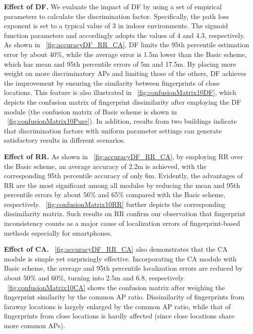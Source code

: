 \documentclass[10pt,conference,compsocconf,letterpaper]{./sty/IEEEtran}
\newcommand{\empha}[1]{{\bf #1}}
\newcommand{\rev}[1]{{\color{blue}#1}} \newcommand{\com}[1]{\textbf{\color{red}(COMMENT: #1)}} \else
\newcommand{\rev}[1]{#1}
\newcommand{\com}[1]{}
\begin{document}
\empha{Effect of DF.}
We evaluate the impact of DF by using a set of empirical parameters to calculate the discrimination factor. Specifically, the path loss exponent is set to a typical value of 3 in indoor environments. The sigmoid function parameters  and  accordingly adopts the values of 4 and 4.3, respectively. As shown in \figurename~\ref{fig:accuracyDF_RR_CA}, DF limits the 95th percentile estimation error by about 40\%, while the average error is 1.5m lower than the Basic scheme, which has mean and 95th percentile errors of 5m and 17.5m. By placing more weight on more discriminatory APs and limiting those of the others, DF achieves the improvement by ensuring the similarity between fingerprints of close locations. This feature is also illustrated in \figurename~\ref{fig:confusionMatrix10DF}, which depicts the confusion matrix of fingerprint dissimilarity after employing the DF module (the confusion matrix of Basic scheme is shown in \figurename~\ref{fig:confusionMatrix10Pure}).  \rev{In addition, results from two buildings indicate that discrimination factors with uniform parameter settings can generate satisfactory results in different scenarios.} 

\empha{Effect of RR.} As shown in \figurename~\ref{fig:accuracyDF_RR_CA}, by employing RR over the Basic scheme, an average accuracy of 2.2m is achieved, with the corresponding 95th percentile accuracy of only 6m.
Evidently, the advantages of RR are the most significant among all modules by reducing the mean and 95th percentile errors by about 56\% and 65\% compared with the Basic scheme, respectively. \figurename~\ref{fig:confusionMatrix10RR} further depicts the corresponding dissimilarity matrix. Such results on RR confirm our observation that fingerprint inconsistency counts as a major cause of localization errors of fingerprint-based methods especially for smartphones.

\empha{Effect of CA.} \figurename~\ref{fig:accuracyDF_RR_CA} also demonstrates that the CA module is simple yet surprisingly effective. Incorporating the CA module with Basic scheme, the average and 95th percentile localization errors are reduced by about 50\% and 60\%, turning into 2.5m and 6.8, respectively. \figurename~\ref{fig:confusionMatrix10CA} shows the confusion matrix after weighing the fingerprint similarity by the common AP ratio. Dissimilarity of fingerprints from faraway locations is largely enlarged by the common AP ratio, while that of fingerprints from close locations is hardly affected (since close locations share more common APs).
\end{document}
